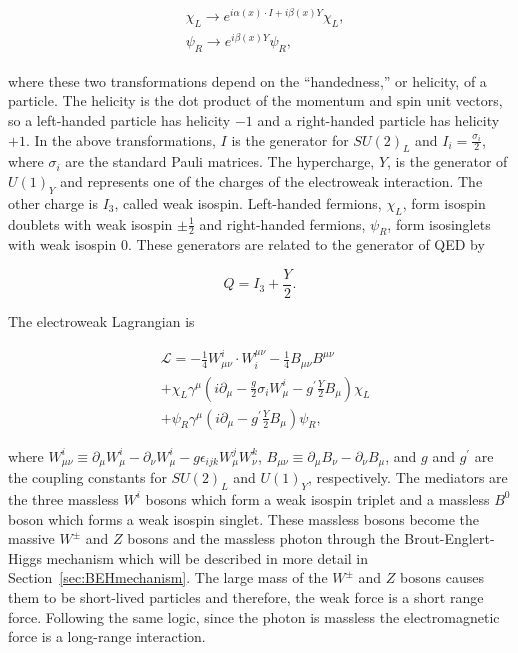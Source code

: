 
\begin{align}
\begin{split}
&\chi_{L}\rightarrow e^{i\alpha (x)\cdot I + i\beta (x)Y}\chi_{L},
\\
&\psi_{R} \rightarrow e^{i\beta(x)Y}\psi_{R},
\end{split}
\end{align}

\noindent
where these two transformations depend on the ``handedness,'' or helicity, of a particle. The helicity is the dot product of the momentum and spin unit vectors, so a left-handed particle has helicity $-1$ and a right-handed particle has helicity $+1$. In the above transformations, $I$ is the generator for $SU(2)_{L}$ and $I_{i}=\frac{\sigma_{i}}{2}$, where $\sigma_{i}$ are the standard Pauli matrices. The hypercharge, $Y$, is the generator of $U(1)_{Y}$ and represents one of the charges of the electroweak interaction. The other charge is $I_{3}$, called weak isospin. Left-handed fermions, $\chi_{L}$, form isospin doublets with weak isospin $\pm\frac{1}{2}$ and right-handed fermions, $\psi_{R}$, form isosinglets with weak isospin $0$. These generators are related to the generator of QED by

\begin{equation}
Q=I_{3}+\frac{Y}{2}.
\end{equation}

\noindent
The electroweak Lagrangian is

\begin{equation}
\begin{split}
&\mathcal{L}=-\frac{1}{4}W^{i}_{\mu\nu}\cdot W_{i}^{\mu\nu} -\frac{1}{4}B_{\mu\nu}B^{\mu\nu} \\
& +\chi_{L}\gamma^{\mu}(i\partial_{\mu}-\frac{g}{2}\sigma_{i}W^{i}_{\mu}-g^{\prime}\frac{Y}{2}B_{\mu})\chi_{L} \\
& + \psi_{R}\gamma^{\mu}(i\partial_{\mu}-g^{\prime}\frac{Y}{2}B_{\mu})\psi_{R},
\end{split}
\end{equation}

\noindent
where $W^{i}_{\mu\nu} \equiv \partial_{\mu}W^{i}_{\mu}-\partial_{\nu}W^{i}_{\mu} -g\epsilon_{ijk}W^{j}_{\mu}W^{k}_{\nu}$, $B_{\mu\nu}\equiv \partial_{\mu}B_{\nu}-\partial_{\nu}B_{\mu}$, and $g$ and $g^{\prime}$ are the coupling constants for $SU(2)_{L}$ and $U(1)_{Y}$, respectively. The mediators are the three massless $W^{i}$ bosons which form a weak isospin triplet and a massless $B^{0}$ boson which forms a weak isospin singlet. These massless bosons become the massive $W^{\pm}$ and $Z$ bosons and the massless photon through the Brout-Englert-Higgs mechanism which will be described in more detail in Section~\ref{sec:BEHmechanism}. The large mass of the $W^{\pm}$ and $Z$ bosons causes them to be short-lived particles and therefore, the weak force is a short range force. Following the same logic, since the photon is massless the electromagnetic force is a long-range interaction.



